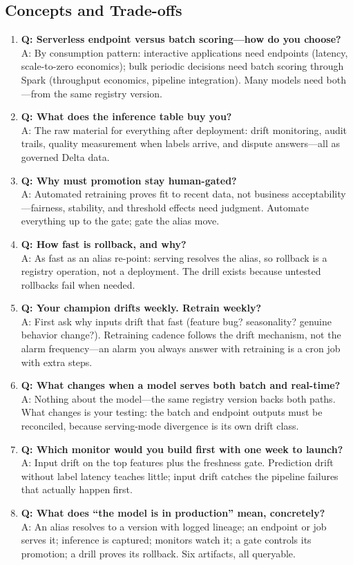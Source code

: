 \subsection{Concepts and Trade-offs}
\begin{enumerate}
    \item \textbf{Q: Serverless endpoint versus batch scoring---how do you choose?}\\
    A: By consumption pattern: interactive applications need endpoints (latency, scale-to-zero economics); bulk periodic decisions need batch scoring through Spark (throughput economics, pipeline integration). Many models need both---from the same registry version.
    \item \textbf{Q: What does the inference table buy you?}\\
    A: The raw material for everything after deployment: drift monitoring, audit trails, quality measurement when labels arrive, and dispute answers---all as governed Delta data.
    \item \textbf{Q: Why must promotion stay human-gated?}\\
    A: Automated retraining proves fit to recent data, not business acceptability---fairness, stability, and threshold effects need judgment. Automate everything up to the gate; gate the alias move.
    \item \textbf{Q: How fast is rollback, and why?}\\
    A: As fast as an alias re-point: serving resolves the alias, so rollback is a registry operation, not a deployment. The drill exists because untested rollbacks fail when needed.
    \item \textbf{Q: Your champion drifts weekly. Retrain weekly?}\\
    A: First ask why inputs drift that fast (feature bug? seasonality? genuine behavior change?). Retraining cadence follows the drift mechanism, not the alarm frequency---an alarm you always answer with retraining is a cron job with extra steps.
    \item \textbf{Q: What changes when a model serves both batch and real-time?}\\
    A: Nothing about the model---the same registry version backs both paths. What changes is your testing: the batch and endpoint outputs must be reconciled, because serving-mode divergence is its own drift class.
    \item \textbf{Q: Which monitor would you build first with one week to launch?}\\
    A: Input drift on the top features plus the freshness gate. Prediction drift without label latency teaches little; input drift catches the pipeline failures that actually happen first.
    \item \textbf{Q: What does ``the model is in production'' mean, concretely?}\\
    A: An alias resolves to a version with logged lineage; an endpoint or job serves it; inference is captured; monitors watch it; a gate controls its promotion; a drill proves its rollback. Six artifacts, all queryable.
\end{enumerate}

